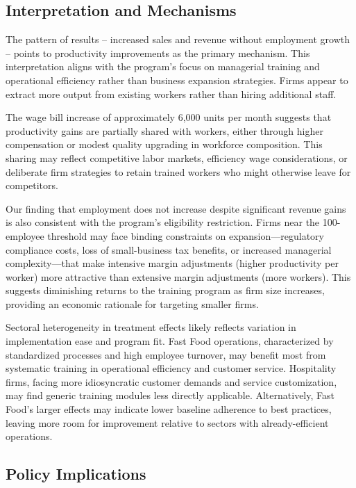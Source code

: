 \documentclass{article}
\begin{document}
\subsection{Interpretation and Mechanisms}

The pattern of results – increased sales and revenue without employment growth – points to productivity improvements as the primary mechanism. This interpretation aligns with the program's focus on managerial training and operational efficiency rather than business expansion strategies. Firms appear to extract more output from existing workers rather than hiring additional staff.

The wage bill increase of approximately 6,000 units per month suggests that productivity gains are partially shared with workers, either through higher compensation or modest quality upgrading in workforce composition. This sharing may reflect competitive labor markets, efficiency wage considerations, or deliberate firm strategies to retain trained workers who might otherwise leave for competitors.

Our finding that employment does not increase despite significant revenue gains is also consistent with the program's eligibility restriction. Firms near the 100-employee threshold may face binding constraints on expansion—regulatory compliance costs, loss of small-business tax benefits, or increased managerial complexity—that make intensive margin adjustments (higher productivity per worker) more attractive than extensive margin adjustments (more workers). This suggests diminishing returns to the training program as firm size increases, providing an economic rationale for targeting smaller firms.

Sectoral heterogeneity in treatment effects likely reflects variation in implementation ease and program fit. Fast Food operations, characterized by standardized processes and high employee turnover, may benefit most from systematic training in operational efficiency and customer service. Hospitality firms, facing more idiosyncratic customer demands and service customization, may find generic training modules less directly applicable. Alternatively, Fast Food's larger effects may indicate lower baseline adherence to best practices, leaving more room for improvement relative to sectors with already-efficient operations.

\subsection{Policy Implications}
\end{document}
